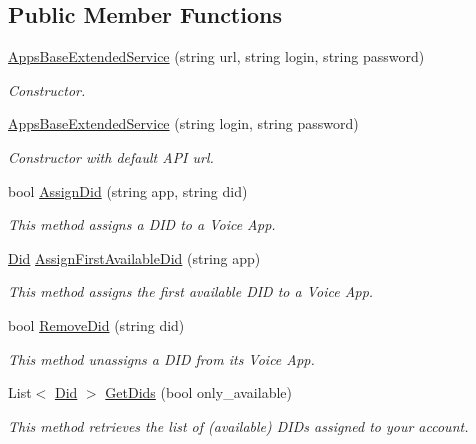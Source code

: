 \subsection*{Public Member Functions}
\begin{DoxyCompactItemize}
\item 
\hyperlink{class_thecallr_api_1_1_services_1_1_client_1_1_apps_base_extended_service_ae22f26bfe5fc700c722d3f07d3ca18af}{Apps\+Base\+Extended\+Service} (string url, string login, string password)
\begin{DoxyCompactList}\small\item\em Constructor. \end{DoxyCompactList}\item 
\hyperlink{class_thecallr_api_1_1_services_1_1_client_1_1_apps_base_extended_service_a193070cf3cf51d8eb7e415d4a8504e40}{Apps\+Base\+Extended\+Service} (string login, string password)
\begin{DoxyCompactList}\small\item\em Constructor with default A\+P\+I url. \end{DoxyCompactList}\item 
bool \hyperlink{class_thecallr_api_1_1_services_1_1_client_1_1_apps_base_extended_service_a983c3162af3403a1193fb750eb3ce6b7}{Assign\+Did} (string app, string did)
\begin{DoxyCompactList}\small\item\em This method assigns a D\+I\+D to a Voice App. \end{DoxyCompactList}\item 
\hyperlink{class_thecallr_api_1_1_objects_1_1_did_1_1_did}{Did} \hyperlink{class_thecallr_api_1_1_services_1_1_client_1_1_apps_base_extended_service_ac6563145ea71814102717f99c34dd994}{Assign\+First\+Available\+Did} (string app)
\begin{DoxyCompactList}\small\item\em This method assigns the first available D\+I\+D to a Voice App. \end{DoxyCompactList}\item 
bool \hyperlink{class_thecallr_api_1_1_services_1_1_client_1_1_apps_base_extended_service_a46c40a1972d8e7120dda4fc617c3faa3}{Remove\+Did} (string did)
\begin{DoxyCompactList}\small\item\em This method unassigns a D\+I\+D from its Voice App. \end{DoxyCompactList}\item 
List$<$ \hyperlink{class_thecallr_api_1_1_objects_1_1_did_1_1_did}{Did} $>$ \hyperlink{class_thecallr_api_1_1_services_1_1_client_1_1_apps_base_extended_service_a2afb0125e7204d6853142e8ffb016e80}{Get\+Dids} (bool only\+\_\+available)
\begin{DoxyCompactList}\small\item\em This method retrieves the list of (available) D\+I\+Ds assigned to your account. \end{DoxyCompactList}\end{DoxyCompactItemize}
